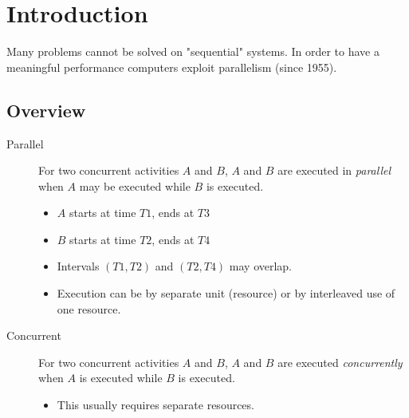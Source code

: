 \section{Introduction}
Many problems cannot be solved on "sequential" systems. In order to have a meaningful performance computers exploit parallelism (since 1955).
\subsection{Overview}
\begin{description}
\item[Parallel] For two concurrent activities $A$ and $B$, $A$ and $B$ are executed in \emph{parallel} when $A$ may be executed while $B$ is executed. 
	\begin{itemize}
		\item $A$ starts at time $T1$, ends at $T3$
		\item $B$ starts at time $T2$, ends at $T4$
		\item Intervals $(T1, T2)$ and $(T2, T4)$ may overlap. 
		\item Execution can be by separate unit (resource) or by interleaved use of one resource.
		
	\end{itemize}

\item[Concurrent] For two concurrent activities $A$ and $B$, $A$ and $B$ are executed \emph{concurrently} when $A$ is executed while $B$ is executed.
	\begin{itemize}
		\item This usually requires separate resources. 
	\end{itemize}
 
\end{description}

